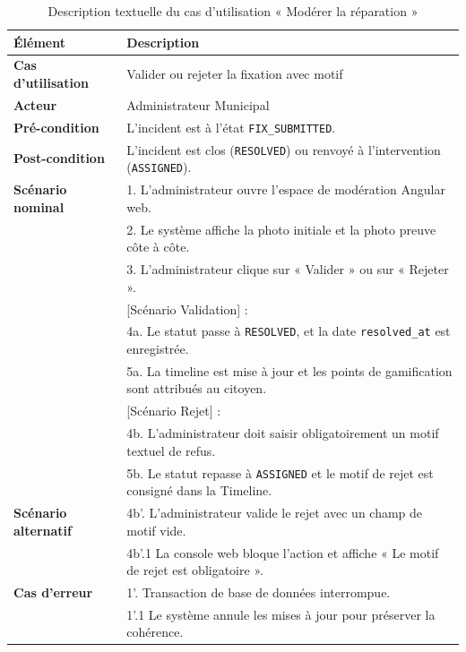 \begin{table}[H]
    \centering
    \caption{Description textuelle du cas d'utilisation « Modérer la réparation »}
    \label{tab:txt_mod_reparation}
    \vspace{0.2cm}
    \small
    \begin{tabularx}{\textwidth}{|l|X|}
        \hline
        \textbf{Élément} & \textbf{Description} \\ \hline
        \textbf{Cas d’utilisation} & Valider ou rejeter la fixation avec motif \\ \hline
        \textbf{Acteur} & Administrateur Municipal \\ \hline
        \textbf{Pré-condition} & L'incident est à l'état \texttt{FIX\_SUBMITTED}. \\ \hline
        \textbf{Post-condition} & L'incident est clos (\texttt{RESOLVED}) ou renvoyé à l'intervention (\texttt{ASSIGNED}). \\ \hline
        \textbf{Scénario nominal} &
        1. L'administrateur ouvre l'espace de modération Angular web.\\
        & 2. Le système affiche la photo initiale et la photo preuve côte à côte.\\
        & 3. L'administrateur clique sur « Valider » ou sur « Rejeter ».\\
        & [Scénario Validation] :\\
        & 4a. Le statut passe à \texttt{RESOLVED}, et la date \texttt{resolved\_at} est enregistrée.\\
        & 5a. La timeline est mise à jour et les points de gamification sont attribués au citoyen.\\
        & [Scénario Rejet] :\\
        & 4b. L'administrateur doit saisir obligatoirement un motif textuel de refus.\\
        & 5b. Le statut repasse à \texttt{ASSIGNED} et le motif de rejet est consigné dans la Timeline. \\ \hline
        \textbf{Scénario alternatif} &
        4b'. L'administrateur valide le rejet avec un champ de motif vide.\\
        & 4b'.1 La console web bloque l'action et affiche « Le motif de rejet est obligatoire ». \\ \hline
        \textbf{Cas d’erreur} &
        1'. Transaction de base de données interrompue.\\
        & 1'.1 Le système annule les mises à jour pour préserver la cohérence. \\ \hline
    \end{tabularx}
\end{table}

